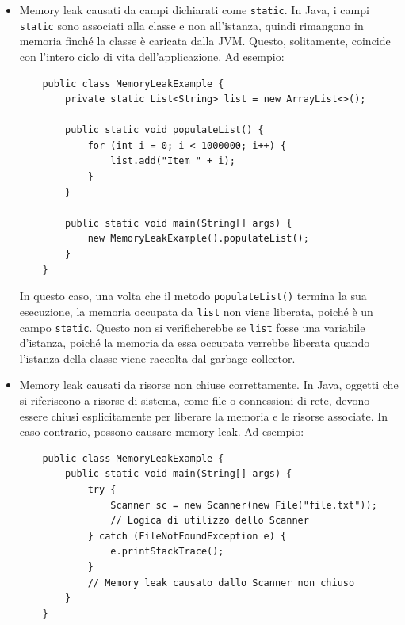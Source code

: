 \begin{itemize}
    \item Memory leak causati da campi dichiarati come \texttt{static}. In Java, i campi \texttt{static} sono associati alla classe e non all'istanza, quindi rimangono in memoria finché la classe è caricata dalla JVM. Questo, solitamente, coincide con l'intero ciclo di vita dell'applicazione. Ad esempio: 
    \begin{verbatim}
    public class MemoryLeakExample {
        private static List<String> list = new ArrayList<>();

        public static void populateList() {
            for (int i = 0; i < 1000000; i++) {
                list.add("Item " + i);
            }
        }

        public static void main(String[] args) {
            new MemoryLeakExample().populateList();
        }
    }
    \end{verbatim}
    In questo caso, una volta che il metodo \texttt{populateList()} termina la sua esecuzione, la memoria occupata da \texttt{list} non viene liberata, poiché è un campo \texttt{static}. Questo non si verificherebbe se \texttt{list} fosse una variabile d'istanza, poiché la memoria da essa occupata verrebbe liberata quando l'istanza della classe viene raccolta dal garbage collector.
    \item Memory leak causati da risorse non chiuse correttamente. In Java, oggetti che si riferiscono a risorse di sistema, come file o connessioni di rete, devono essere chiusi esplicitamente per liberare la memoria e le risorse associate. In caso contrario, possono causare memory leak. Ad esempio:
    \begin{verbatim}
    public class MemoryLeakExample {
        public static void main(String[] args) {
            try {
                Scanner sc = new Scanner(new File("file.txt"));
                // Logica di utilizzo dello Scanner
            } catch (FileNotFoundException e) {
                e.printStackTrace();
            }
            // Memory leak causato dallo Scanner non chiuso
        }
    }
    \end{verbatim}
\end{itemize}

